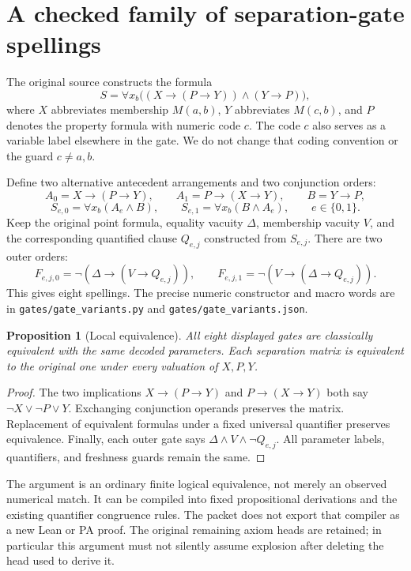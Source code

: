 \documentclass[11pt,letterpaper]{article}
\newtheorem{proposition}[theorem]{Proposition}
\newcommand{\file}[1]{\texttt{\nolinkurl{#1}}}
\newcommand{\imp}{\mathbin{\to}}
\begin{document}
\section{A checked family of separation-gate spellings}
\label{sec:gates}

The original source constructs the formula
\[
 S=\forall x_b\bigl((X\imp(P\imp Y))\wedge(Y\imp P)\bigr),
\]
where $X$ abbreviates membership $M(a,b)$, $Y$ abbreviates $M(c,b)$, and
$P$ denotes the property formula with numeric code $c$. The code $c$ also
serves as a variable label elsewhere in the gate. We do not change that
coding convention or the guard $c\ne a,b$.

Define two alternative antecedent arrangements and two conjunction orders:
\[
 A_0=X\imp(P\imp Y),\qquad A_1=P\imp(X\imp Y),\qquad B=Y\imp P,
\]
\[
 S_{e,0}=\forall x_b(A_e\wedge B),\qquad
 S_{e,1}=\forall x_b(B\wedge A_e),\qquad e\in\{0,1\}.
\]
Keep the original point formula, equality vacuity $\Delta$, membership vacuity
$V$, and the corresponding quantified clause $Q_{e,j}$ constructed from
$S_{e,j}$. There are two outer orders:
\[
 F_{e,j,0}=\neg(\Delta\imp(V\imp Q_{e,j})),\qquad
 F_{e,j,1}=\neg(V\imp(\Delta\imp Q_{e,j})).
\]
This gives eight spellings. The precise numeric constructor and macro words
are in \file{gates/gate_variants.py} and \file{gates/gate_variants.json}.

\begin{proposition}[Local equivalence]
All eight displayed gates are classically equivalent with the same decoded
parameters. Each separation matrix is equivalent to the original one under
every valuation of $X,P,Y$.
\end{proposition}
\begin{proof}
The two implications $X\imp(P\imp Y)$ and $P\imp(X\imp Y)$ both say
$\neg X\vee\neg P\vee Y$. Exchanging conjunction operands preserves the
matrix. Replacement of equivalent formulas under a fixed universal
quantifier preserves equivalence. Finally, each outer gate says
$\Delta\wedge V\wedge\neg Q_{e,j}$. All parameter labels, quantifiers,
and freshness guards remain the same.
\end{proof}

The argument is an ordinary finite logical equivalence, not merely an
observed numerical match. It can be compiled into fixed propositional
derivations and the existing quantifier congruence rules. The packet does
not export that compiler as a new Lean or PA proof. The original remaining
axiom heads are retained; in particular this argument must not silently
assume explosion after deleting the head used to derive it.
\end{document}
